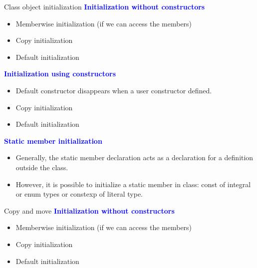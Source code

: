 \documentclass[13pt]{beamer}
\begin{document}
\begin{frame}{Class object initialization}
  \textcolor{blue}{\textbf{Initialization without constructors}}
  \begin{itemize}
      \item Memberwise initialization (if we can access the members)
      \item Copy initialization
      \item Default initialization
  \end{itemize}
  \textcolor{blue}{\textbf{Initialization using constructors}}
  \begin{itemize}
      \item Default constructor disappears when a user constructor defined.
      \item Copy initialization
      \item Default initialization
    \end{itemize}
  \textcolor{blue}{\textbf{Static member initialization}}
  \begin{itemize}
    \item Generally, the static member declaration acts as a declaration for a definition outside the class.
    \item However, it is possible to initialize a static member in class: const of integral or enum types or constexp of literal type.
  \end{itemize}
\end{frame}

\begin{frame}{Copy and move}
  \textcolor{blue}{\textbf{Initialization without constructors}}
  \begin{itemize}
      \item Memberwise initialization (if we can access the members)
      \item Copy initialization
      \item Default initialization
  \end{itemize}
\end{frame}
\end{document}
